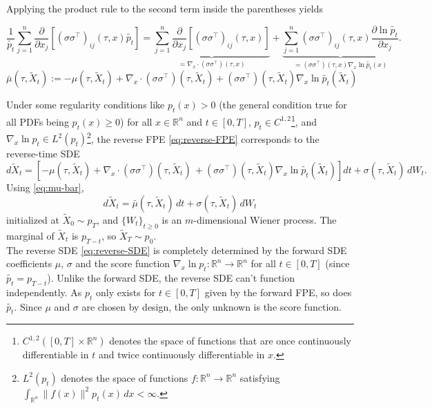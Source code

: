 \documentclass[11pt]{amsart}
\theoremstyle{plain}
\theoremstyle{definition}
\theoremstyle{remark}
\numberwithin{equation}{section}
\begin{document}
{Applying the product rule to the second term inside the parentheses yields

\begin{equation}
    \frac{1}{\tilde{p_{t}}}\sum_{j=1}^n \frac{\partial}{\partial x_j}
    [(\sigma\sigma^\top)_{ij}(\tau, x)\tilde{p_{t}}] = \underbrace{\sum_{j=1}^n \frac{\partial}{\partial x_j}
    [(\sigma\sigma^\top)_{ij}(\tau, x)]}_{=\nabla_x \cdot (\sigma\sigma^\top)(\tau, x)}+\underbrace{\sum_{j=1}^n
    (\sigma\sigma^\top)_{ij}(\tau, x)\frac{\partial \ln\tilde{p_{t}}}{\partial x_j}}_{=(\sigma\sigma^\top)(\tau, x)\nabla_x \ln \tilde{p_{t}}(x)}.
\end{equation}
\begin{equation}
    \bar{\mu}(\tau, \tilde{X}_t):= -\mu(\tau, \tilde{X}_t) + \nabla_x \cdot (\sigma\sigma^\top)(\tau, \tilde{X}_t) + (\sigma\sigma^\top)(\tau, \tilde{X}_t)\nabla_x \ln \tilde{p_{t}}(\tilde{X}_t)
    \label{eq:mu-bar}
\end{equation}

Under some regularity conditions like $p_t(x) > 0$ (the general condition true for all PDFs being $p_t(x) \geq 0$) for all $x \in \mathbb{R}^n$ and $t \in [0,T]$,
$p_t \in C^{1,2}$\footnote{$C^{1,2}([0,T] \times \mathbb{R}^n)$ denotes the space of functions 
that are once continuously differentiable in $t$ and twice continuously 
differentiable in $x$.}, and $\nabla_x \ln p_t \in L^2(p_t)$\footnote{$L^2(p_t)$ denotes the space of functions 
$f : \mathbb{R}^n \to \mathbb{R}^n$ satisfying $\int_{\mathbb{R}^n} 
\|f(x)\|^2 p_t(x)\,dx < \infty$.}, 
the reverse FPE \eqref{eq:reverse-FPE} corresponds to the reverse-time 
SDE \cite{anderson1982}
\begin{equation}
    d\tilde{X}_t = \left[-\mu(\tau, \tilde{X}_t) + 
    \nabla_x \cdot (\sigma\sigma^\top)(\tau, \tilde{X}_t)\,+
    (\sigma\sigma^\top)(\tau, \tilde{X}_t)\nabla_x \ln \tilde{p_{t}}(\tilde{X}_t)\right]dt 
    + \sigma(\tau, \tilde{X}_t)\,d{W}_t.
    \label{eq:reverse-SDE}
\end{equation}
Using \eqref{eq:mu-bar},
\begin{equation}
    d\tilde{X}_t = \bar{\mu}(\tau, \tilde{X}_t)\,dt + \sigma(\tau, \tilde{X}_t)\,d{W}_t
\end{equation}
initialized at $\tilde{X}_0 \sim p_T$, and $\{{W}_t\}_{t \geq 0}$ is an $m$-dimensional Wiener process. The marginal of $\tilde{X}_t$ is $p_{T-t}$, so 
$\tilde{X}_T \sim p_0$.\\

The reverse SDE \eqref{eq:reverse-SDE} is completely determined by the 
forward SDE coefficients $\mu$, $\sigma$ and the score function 
$\nabla_x \ln p_t: \mathbb{R}^n \to \mathbb{R}^n$ for all $t \in [0,T]$ (since $\tilde{p_t}=p_{T-t}$). Unlike the forward SDE, the reverse SDE can't function independently. As $p_t$ only exists for $t \in [0,T]$ given by the forward FPE, so does $\tilde{p_t}$. Since $\mu$ and $\sigma$ are chosen by design, 
the only unknown is the score function.\\

}
\end{document}
